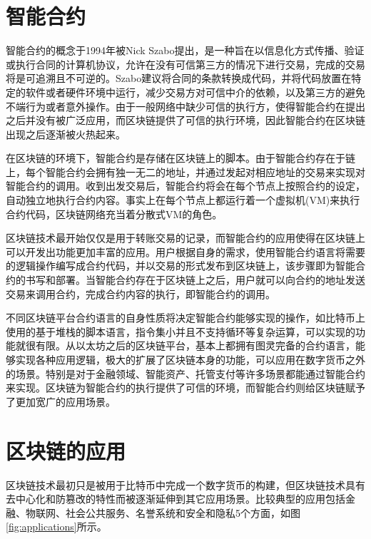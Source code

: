 \section{智能合约}

智能合约的概念于1994年被Nick Szabo提出\supercite{szabo1996smart}，是一种旨在以信息化方式传播、验证或执行合同的计算机协议，允许在没有可信第三方的情况下进行交易，完成的交易将是可追溯且不可逆的。Szabo建议将合同的条款转换成代码，并将代码放置在特定的软件或者硬件环境中运行，减少交易方对可信中介的依赖，以及第三方的避免不端行为或者意外操作。由于一般网络中缺少可信的执行方，使得智能合约在提出之后并没有被广泛应用，而区块链提供了可信的执行环境，因此智能合约在区块链出现之后逐渐被火热起来。

在区块链的环境下，智能合约是存储在区块链上的脚本。由于智能合约存在于链上，每个智能合约会拥有独一无二的地址，并通过发起对相应地址的交易来实现对智能合约的调用。收到出发交易后，智能合约将会在每个节点上按照合约的设定，自动独立地执行合约内容。事实上在每个节点上都运行着一个虚拟机(VM)来执行合约代码，区块链网络充当着分散式VM的角色。

区块链技术最开始仅仅是用于转账交易的记录，而智能合约的应用使得在区块链上可以开发出功能更加丰富的应用。用户根据自身的需求，使用智能合约语言将需要的逻辑操作编写成合约代码，并以交易的形式发布到区块链上，该步骤即为智能合约的书写和部署。当智能合约存在于区块链上之后，用户就可以向合约的地址发送交易来调用合约，完成合约内容的执行，即智能合约的调用。


不同区块链平台合约语言的自身性质将决定智能合约能够实现的操作，如比特币上使用的基于堆栈的脚本语言，指令集小并且不支持循环等复杂运算，可以实现的功能就很有限。从以太坊之后的区块链平台，基本上都拥有图灵完备的合约语言，能够实现各种应用逻辑，极大的扩展了区块链本身的功能，可以应用在数字货币之外的场景。特别是对于金融领域、智能资产、托管支付等许多场景都能通过智能合约来实现。区块链为智能合约的执行提供了可信的环境，而智能合约则给区块链赋予了更加宽广的应用场景。



\section{区块链的应用}

区块链技术最初只是被用于比特币中完成一个数字货币的构建，但区块链技术具有去中心化和防篡改的特性而被逐渐延伸到其它应用场景。比较典型的应用包括金融、物联网、社会公共服务、名誉系统和安全和隐私5个方面\supercite{zheng2016blockchain}，如图\ref{fig:applications}所示。

